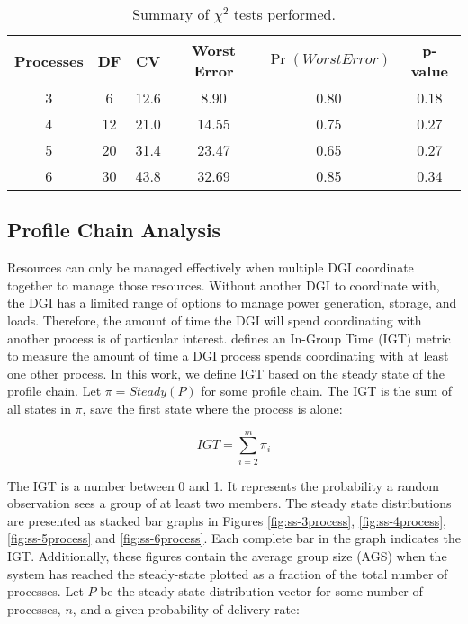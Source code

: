 \begin{table*}[!t]
\centering
\caption{Summary of $\chi^2$ tests performed.}
\begin{tabular}{ c | c c c c c}
  \hline
  Processes & DF & CV & Worst Error & $\Pr(WorstError)$ &  p-value \\ \hline
  3 & 6 & 12.6 & 8.90 & 0.80 & 0.18 \\
  4 & 12 & 21.0 & 14.55 & 0.75 & 0.27 \\
  5 & 20 & 31.4 & 23.47 & 0.65 & 0.27 \\
  6 & 30 & 43.8 & 32.69 & 0.85 & 0.34 \\
\end{tabular}

\label{tab:chisummary}
\end{table*}

\subsection{Profile Chain Analysis}

Resources can only be managed effectively when multiple \ac{DGI} coordinate together to manage those resources.
Without another DGI to coordinate with, the DGI has a limited range of options to manage power generation, storage, and loads.
Therefore, the amount of time the DGI will spend coordinating with another process is of particular interest.
\cite{CRITIS2012} defines an In-Group Time (IGT) metric to measure the amount of time a DGI process spends coordinating with at least one other process.
In this work, we define \ac{IGT} based on the steady state of the profile chain.
Let $\pi=Steady(P)$ for some profile chain.
The \ac{IGT} is the sum of all states in $\pi$, save the first state where the process is alone:

\begin{equation} IGT = \sum_{i=2}^{m} \pi_i \end{equation}

The \ac{IGT} is a number between 0 and 1.
It represents the probability a random observation sees a group of at least two members.
The steady state distributions are presented as stacked bar graphs in Figures \ref{fig:ss-3process}, \ref{fig:ss-4process}, \ref{fig:ss-5process} and \ref{fig:ss-6process}.
Each complete bar in the graph indicates the \ac{IGT}.
Additionally, these figures contain the average group size (AGS) when the system has reached the steady-state plotted as a fraction of the total number of processes.
Let $P$ be the steady-state distribution vector for some number of processes, $n$, and a given probability of delivery rate:

